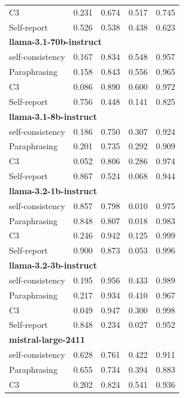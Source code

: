 \documentclass[11pt]{article}
\theoremstyle{plain}
\theoremstyle{definition}
\theoremstyle{remark}
\begin{document}
\begin{table}[p]
\begin{minipage}[t]{0.48\textwidth}
\begin{tabular}{lcccc}
       C3             & 0.231 & 0.674 & 0.517 & 0.745 \\
        Self-report      & 0.526 & 0.538 & 0.438 & 0.623 \\
        \midrule
        \multicolumn{5}{l}{\textbf{llama-3.1-70b-instruct}} \\
        self-consistency & 0.167 & 0.834 & 0.548 & 0.957 \\
        Paraphrasing     & 0.158 & 0.843 & 0.556 & 0.965 \\
       C3             & 0.086 & 0.890 & 0.600 & 0.972 \\
        Self-report      & 0.756 & 0.448 & 0.141 & 0.825 \\
        \midrule
        \multicolumn{5}{l}{\textbf{llama-3.1-8b-instruct}} \\
        self-consistency & 0.186 & 0.750 & 0.307 & 0.924 \\
        Paraphrasing     & 0.201 & 0.735 & 0.292 & 0.909 \\
       C3             & 0.052 & 0.806 & 0.286 & 0.974 \\
        Self-report      & 0.867 & 0.524 & 0.068 & 0.944 \\
        \midrule
        \multicolumn{5}{l}{\textbf{llama-3.2-1b-instruct}} \\
        self-consistency & 0.857 & 0.798 & 0.010 & 0.975 \\
        Paraphrasing     & 0.848 & 0.807 & 0.018 & 0.983 \\
       C3             & 0.246 & 0.942 & 0.125 & 0.999 \\
        Self-report      & 0.900 & 0.873 & 0.053 & 0.996 \\
        \midrule
        \multicolumn{5}{l}{\textbf{llama-3.2-3b-instruct}} \\
        self-consistency & 0.195 & 0.956 & 0.433 & 0.989 \\
        Paraphrasing     & 0.217 & 0.934 & 0.410 & 0.967 \\
       C3             & 0.049 & 0.947 & 0.300 & 0.998 \\
        Self-report      & 0.848 & 0.234 & 0.027 & 0.952 \\
        \midrule
        \multicolumn{5}{l}{\textbf{mistral-large-2411}} \\
        self-consistency & 0.628 & 0.761 & 0.422 & 0.911 \\
        Paraphrasing     & 0.655 & 0.734 & 0.394 & 0.883 \\
       C3             & 0.202 & 0.824 & 0.541 & 0.936 \\

\end{tabular}
\end{minipage}
\end{table}
\end{document}
